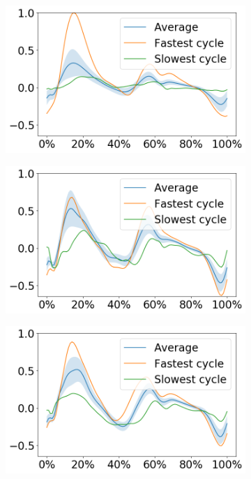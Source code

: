 \documentclass[../main.tex]{subfiles}
\begin{document}
\begin{figure}[ht!]
     \centering
     \begin{subfigure}[b]{0.328\textwidth}
         \centering
         \includegraphics[width=\textwidth]{img/results/moment_avg/subject01_all_set1_moment_avg_w_minmax.png}
     \end{subfigure}
     \hfill
     \begin{subfigure}[b]{0.328\textwidth}
         \centering
         \includegraphics[width=\textwidth]{img/results/moment_avg/subject02_all_set1_moment_avg_w_minmax.png}
     \end{subfigure}
     \hfill
     \begin{subfigure}[b]{0.328\textwidth}
         \centering
         \includegraphics[width=\textwidth]{img/results/moment_avg/subject06_all_set1_moment_avg_w_minmax.png}

\end{subfigure}
\end{figure}
\end{document}
